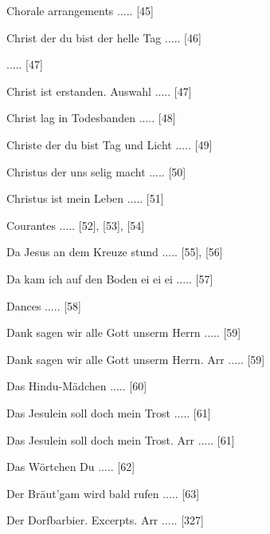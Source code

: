 \documentclass[twocolumn]{book}
\begin{document}
\newline 
Chorale arrangements ..... [45]

\newline 
Christ der du bist der helle Tag ..... [46]

 ..... [47]

\newline 
Christ ist erstanden. Auswahl ..... [47]

\newline 
Christ lag in Todesbanden ..... [48]

\newline 
Christe der du bist Tag und Licht ..... [49]

\newline 
Christus der uns selig macht ..... [50]

\newline 
Christus ist mein Leben ..... [51]

\newline 
Courantes ..... [52], [53], [54]

\newline 
Da Jesus an dem Kreuze stund ..... [55], [56]

\newline 
Da kam ich auf den Boden ei ei ei ..... [57]

\newline 
Dances ..... [58]

\newline 
Dank sagen wir alle Gott unserm Herrn ..... [59]

\newline 
Dank sagen wir alle Gott unserm Herrn. Arr ..... [59]

\newline 
Das Hindu-Mädchen ..... [60]

\newline 
Das Jesulein soll doch mein Trost ..... [61]

\newline 
Das Jesulein soll doch mein Trost. Arr ..... [61]

\newline 
Das Wörtchen Du ..... [62]

\newline 
Der Bräut'gam wird bald rufen ..... [63]

\newline 
Der Dorfbarbier. Excerpts. Arr ..... [327]
\end{document}
